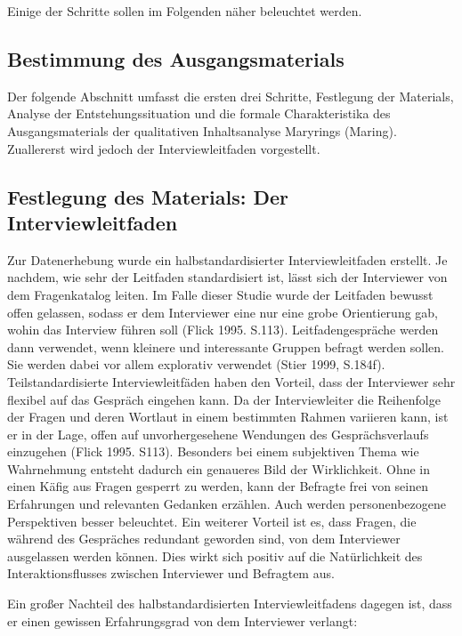 \documentclass[12pt]{article}
\begin{document}
Einige der Schritte sollen im Folgenden näher beleuchtet werden.

\subsection{Bestimmung des Ausgangsmaterials}

Der folgende Abschnitt umfasst die ersten drei Schritte, \glqq Festlegung der Materials\grqq{}, \glqq Analyse der Entstehungssituation\grqq{} und die \glqq formale Charakteristika des Ausgangsmaterials\grqq{} der qualitativen Inhaltsanalyse Maryrings (Maring). Zuallererst wird jedoch der Interviewleitfaden vorgestellt.

\subsection{Festlegung des Materials: Der Interviewleitfaden}

Zur Datenerhebung wurde ein halbstandardisierter Interviewleitfaden erstellt. Je nachdem, wie sehr der Leitfaden standardisiert ist, lässt sich der Interviewer von dem Fragenkatalog leiten. Im Falle dieser Studie wurde der Leitfaden bewusst offen gelassen, sodass er dem Interviewer eine nur eine grobe Orientierung gab, wohin das Interview führen soll (Flick 1995. S.113).
Leitfadengespräche werden dann verwendet, wenn kleinere und interessante Gruppen befragt werden sollen. Sie werden dabei vor allem explorativ verwendet (Stier 1999, S.184f). Teilstandardisierte Interviewleitfäden haben den Vorteil, dass der Interviewer sehr flexibel auf das Gespräch eingehen kann. Da der Interviewleiter die Reihenfolge der Fragen und deren Wortlaut in einem bestimmten Rahmen variieren kann, ist er in der Lage, offen auf unvorhergesehene Wendungen des Gesprächsverlaufs einzugehen (Flick 1995. S113). Besonders bei einem subjektiven Thema wie Wahrnehmung entsteht dadurch ein genaueres Bild der Wirklichkeit. Ohne in einen Käfig aus Fragen gesperrt zu werden, kann der Befragte frei von seinen Erfahrungen und relevanten Gedanken erzählen. Auch werden personenbezogene Perspektiven besser beleuchtet. Ein weiterer Vorteil ist es, dass Fragen, die während des Gespräches redundant geworden sind, von dem Interviewer ausgelassen werden können. Dies wirkt sich positiv auf die Natürlichkeit des Interaktionsflusses zwischen Interviewer und Befragtem aus.

Ein großer Nachteil des halbstandardisierten Interviewleitfadens dagegen ist, dass er einen gewissen Erfahrungsgrad von dem Interviewer verlangt:
\end{document}
